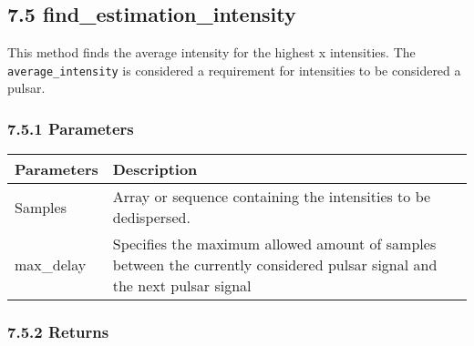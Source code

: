\documentclass[]{article}
\begin{document}
\subsection{7.5
find\_estimation\_intensity}\label{find_estimation_intensity}

This method finds the average intensity for the highest x intensities.
The \texttt{average\_intensity} is considered a requirement for
intensities to be considered a pulsar.

\subsubsection{7.5.1 Parameters}\label{parameters-7}

\begin{longtable}[]{@{}ll@{}}
\toprule
\begin{minipage}[b]{0.41\columnwidth}\raggedright\strut
Parameters\strut
\end{minipage} & \begin{minipage}[b]{0.41\columnwidth}\raggedright\strut
Description\strut
\end{minipage}\tabularnewline
\midrule
\endhead
\begin{minipage}[t]{0.41\columnwidth}\raggedright\strut
Samples\strut
\end{minipage} & \begin{minipage}[t]{0.41\columnwidth}\raggedright\strut
Array or sequence containing the intensities to be dedispersed.\strut
\end{minipage}\tabularnewline
\begin{minipage}[t]{0.41\columnwidth}\raggedright\strut
max\_delay\strut
\end{minipage} & \begin{minipage}[t]{0.41\columnwidth}\raggedright\strut
Specifies the maximum allowed amount of samples between the currently
considered pulsar signal and the next pulsar signal\strut
\end{minipage}\tabularnewline
\bottomrule
\end{longtable}

\subsubsection{7.5.2 Returns}\label{returns-4}
\end{document}
